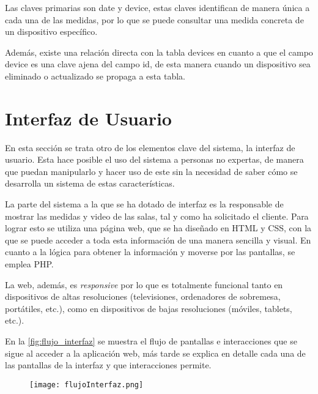 Las claves primarias son date y device, estas claves identifican de manera única a cada una de las medidas, por lo que se puede consultar una medida concreta de un dispositivo específico.

Además, existe una relación directa con la tabla devices en cuanto a que el campo device es una clave ajena del campo id, de esta manera cuando un dispositivo sea eliminado o actualizado se propaga a esta tabla.

\section{Interfaz de Usuario}\label{sec:interfaz}
En esta sección se trata otro de los elementos clave del sistema, la interfaz de usuario. Esta hace posible el uso del sistema a personas no expertas, de manera que puedan manipularlo y hacer uso de este sin la necesidad de saber cómo se desarrolla un sistema de estas características.

La parte del sistema a la que se ha dotado de interfaz es la responsable de mostrar las medidas y video de las salas, tal y como ha solicitado el cliente. Para lograr esto se utiliza una página web, que se ha diseñado en HTML y CSS, con la que se puede acceder a toda esta información de una manera sencilla y visual. En cuanto a la lógica para obtener la información y moverse por las pantallas, se emplea PHP\@.

La web, además, es \textit{responsive} por lo que es totalmente funcional tanto en dispositivos de altas resoluciones (televisiones, ordenadores de sobremesa, portátiles, etc.), como en dispositivos de bajas resoluciones (móviles, tablets, etc.).

En la \autoref{fig:flujo_interfaz} se muestra el flujo de pantallas e interacciones que se sigue al acceder a la aplicación web, más tarde se explica en detalle cada una de las pantallas de la interfaz y que interacciones permite.
\begin{figure}[H]
	{\texttt{[image: flujoInterfaz.png]}}
\end{figure}

